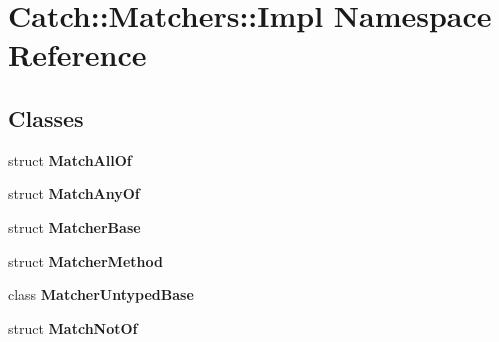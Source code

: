 \section{Catch\+::Matchers\+::Impl Namespace Reference}
\label{namespace_catch_1_1_matchers_1_1_impl}
\subsection*{Classes}
\begin{DoxyCompactItemize}
\item 
struct \textbf{ Match\+All\+Of}
\item 
struct \textbf{ Match\+Any\+Of}
\item 
struct \textbf{ Matcher\+Base}
\item 
struct \textbf{ Matcher\+Method}
\item 
class \textbf{ Matcher\+Untyped\+Base}
\item 
struct \textbf{ Match\+Not\+Of}
\end{DoxyCompactItemize}
